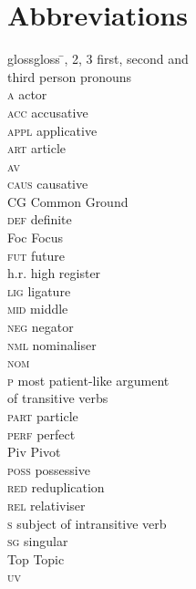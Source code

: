 \documentclass[output=paper
,modfonts
,nonflat]{langsci/langscibook}
\begin{document}
\section*{Abbreviations}

\begin{multicols}{2}
	\begin{tabbing}
		glossgloss \= , 2, 3 \> first, second and \\ \> third person pronouns\\
		\textsc{a}\> actor\\
		\textsc{acc} \> accusative\\
		\textsc{appl} \> applicative\\
		\textsc{art} \> article\\
		\textsc{av} \> \\
		\textsc{caus} \> causative\\
		CG \> Common Ground\\
		\textsc{def} \> definite\\
		Foc \> Focus\\
		\textsc{fut} \> future\\
		h.r. \> high register\\
		\textsc{lig} \> ligature\\
		\textsc{mid} \> middle \\
		\textsc{neg} \> negator\\
		\textsc{nml} \> nominaliser\\
		\textsc{nom} \> \\
		\textsc{p} \> most patient-like argument \\ \> of transitive verbs\\
		\textsc{part} \> particle\\
		\textsc{perf} \> perfect\\
		Piv \> Pivot\\
		\textsc{poss} \> possessive\\
		\textsc{red} \> reduplication\\
		\textsc{rel} \> relativiser\\
		\textsc{s} \> subject of intransitive verb\\
		\textsc{sg} \> singular\\
		Top \> Topic\\
		\textsc{uv} \> 
	\end{tabbing}
\end{multicols}

\printbibliography[heading=subbibliography,notkeyword=this]
\end{document}
